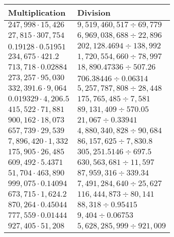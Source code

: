 \begin{longtable}[]{@{}ll@{}}
\toprule
Multiplication & Division\tabularnewline
\midrule
\endhead
\(247,998\cdot15,426\) & \(9,519,460,517÷69,779\)\tabularnewline
\(27,815\cdot307,754\) & \(6,969,038,688÷22,896\)\tabularnewline
\(0.19128\cdot0.51951\) & \(202,128.4694÷138,992\)\tabularnewline
\(234,675\cdot421.2\) & \(1,720,554,660÷78,997\)\tabularnewline
\(713,718\cdot0.02884\) & \(18,890.47336÷507.26\)\tabularnewline
\(273,257\cdot95,030\) & \(706.38446÷0.06314\)\tabularnewline
\(332,391.6\cdot9,064\) & \(5,257,787,808÷28,448\)\tabularnewline
\(0.019329\cdot4,206.5\) & \(175,765,485÷7,581\)\tabularnewline
\(415,522\cdot71,881\) & \(89,131,409÷570.05\)\tabularnewline
\(900,162\cdot18,073\) & \(21,067÷0.33941\)\tabularnewline
\(657,739\cdot29,539\) & \(4,880,340,828÷90,684\)\tabularnewline
\(7,896,420\cdot1,332\) & \(86,157,625÷7,830.8\)\tabularnewline
\(175,905\cdot26,485\) & \(305,251.5146÷697.5\)\tabularnewline
\(609,492\cdot5.4371\) & \(630,563,681÷11,597\)\tabularnewline
\(51,704\cdot463,890\) & \(87,959,316÷339.34\)\tabularnewline
\(999,075\cdot0.14094\) & \(7,491,284,640÷25,627\)\tabularnewline
\(673,715\cdot1,624.2\) & \(116,444,873÷80,141\)\tabularnewline
\(870,264\cdot0.45044\) & \(88,318÷0.95415\)\tabularnewline
\(777,559\cdot0.01444\) & \(9,404÷0.06753\)\tabularnewline
\(927,405\cdot51,208\) & \(5,628,285,999÷921,009\)\tabularnewline
\bottomrule
\end{longtable}
